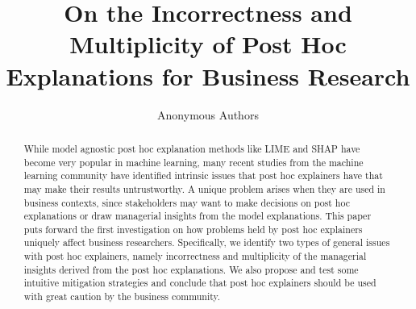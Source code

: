 \documentclass[11pt]{article}    %
\date{}
\begin{document}
\title{On the Incorrectness and Multiplicity of Post Hoc Explanations for Business Research}

\author{Anonymous Authors}






\maketitle

\begin{abstract}
   While model agnostic post hoc explanation methods like LIME and SHAP have become very popular in machine learning, many recent studies from the machine learning community have identified intrinsic issues that post hoc explainers have that may make their results untrustworthy. A unique problem arises when they are used in business contexts, since stakeholders may want to make decisions on post hoc explanations or draw managerial insights from the model explanations. %
   This paper puts forward the first investigation on how problems held by post hoc explainers uniquely affect business researchers. Specifically, we identify two types of general issues with post hoc explainers, namely incorrectness and multiplicity of the managerial insights derived from the post hoc explanations.  We also propose and test some intuitive mitigation strategies and conclude that post hoc explainers should be used with great caution  by the business community.
\end{abstract}%
%
\end{document}

